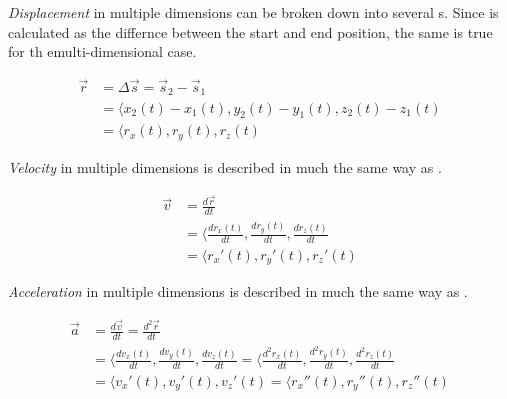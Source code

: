 \begin{definition} \label{Multi-D Displacement}
  \emph{Displacement} in multiple dimensions can be broken down into several s.
  Since  is calculated as the differnce between the start and end position, the same is true for th emulti-dimensional case.

  \begin{equation} \label{eq:Multi-D Displacement}
    \begin{aligned}
      \vec{r} &= \Delta \vec{s} = \vec{s}_{2} - \vec{s}_{1} \\
      &= \langle x_{2}(t)-x_{1}(t), y_{2}(t)-y_{1}(t), z_{2}(t)-z_{1}(t) \\
      &= \langle r_{x}(t), r_{y}(t), r_{z}(t)
    \end{aligned}
  \end{equation}
\end{definition}

\begin{definition} \label{Multi-D Velocity}
  \emph{Velocity} in multiple dimensions is described in much the same way as .

  \begin{equation} \label{eq:Multi-D Velocity}
    \begin{aligned}
      \vec{v} &= \frac{d \vec{r}}{dt} \\
      &= \langle \frac{d r_{x}(t)}{dt}, \frac{d r_{y}(t)}{dt}, \frac{d r_{z}(t)}{dt} \\
      &= \langle r_{x}'(t), r_{y}'(t), r_{z}'(t)
    \end{aligned}
  \end{equation}
\end{definition}

\begin{definition} \label{Multi-D Acceleration}
  \emph{Acceleration} in multiple dimensions is described in much the same way as .

  \begin{equation} \label{eq:Multi-D Acceleration}
    \begin{aligned}
      \vec{a} &= \frac{d \vec{v}}{dt} = \frac{d^{2} \vec{r}}{dt} \\
      &= \langle \frac{d v_{x}(t)}{dt}, \frac{d v_{y}(t)}{dt}, \frac{d v_{z}(t)}{dt} = \langle \frac{d^{2} r_{x}(t)}{dt}, \frac{d^{2} r_{y}(t)}{dt}, \frac{d^{2} r_{z}(t)}{dt} \\
      &= \langle v_{x}'(t), v_{y}'(t), v_{z}'(t) = \langle r_{x}''(t), r_{y}''(t), r_{z}''(t)
    \end{aligned}
  \end{equation}
\end{definition}

